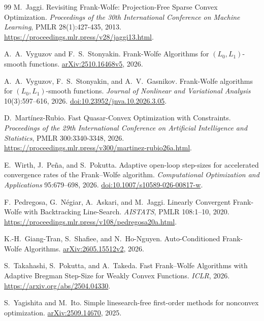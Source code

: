 \begin{thebibliography}{99}
M.~Jaggi.
Revisiting Frank-Wolfe: Projection-Free Sparse Convex Optimization.
\emph{Proceedings of the 30th International Conference on Machine Learning},
PMLR 28(1):427-435, 2013.
\url{https://proceedings.mlr.press/v28/jaggi13.html}.

A.~A.~Vyguzov and F.~S.~Stonyakin.
Frank-Wolfe Algorithms for $(L_0,L_1)$-smooth functions.
\href{https://arxiv.org/abs/2510.16468v5}{arXiv:2510.16468v5}, 2026.

A.~A.~Vyguzov, F.~S.~Stonyakin, and A.~V.~Gasnikov.
Frank-Wolfe algorithms for $(L_0,L_1)$-smooth functions.
\emph{Journal of Nonlinear and Variational Analysis} 10(3):597--616, 2026.
\href{https://doi.org/10.23952/jnva.10.2026.3.05}{doi:10.23952/jnva.10.2026.3.05}.

D.~Mart\'{i}nez-Rubio.
Fast Quasar-Convex Optimization with Constraints.
\emph{Proceedings of the 29th International Conference on
Artificial Intelligence and Statistics}, PMLR 300:3340-3348, 2026.
\url{https://proceedings.mlr.press/v300/martinez-rubio26a.html}.

E.~Wirth, J.~Pe\~na, and S.~Pokutta.
Adaptive open-loop step-sizes for accelerated convergence rates of the
Frank--Wolfe algorithm.
\emph{Computational Optimization and Applications} 95:679--698, 2026.
\href{https://doi.org/10.1007/s10589-026-00817-w}{doi:10.1007/s10589-026-00817-w}.

F.~Pedregosa, G.~N\'{e}giar, A.~Askari, and M.~Jaggi.
Linearly Convergent Frank-Wolfe with Backtracking Line-Search.
\emph{AISTATS}, PMLR 108:1--10, 2020.
\url{https://proceedings.mlr.press/v108/pedregosa20a.html}.

K.-H.~Giang-Tran, S.~Shafiee, and N.~Ho-Nguyen.
Auto-Conditioned Frank-Wolfe Algorithms.
\href{https://arxiv.org/abs/2605.15512v2}{arXiv:2605.15512v2}, 2026.

S.~Takahashi, S.~Pokutta, and A.~Takeda.
Fast Frank--Wolfe Algorithms with Adaptive Bregman Step-Size for Weakly
Convex Functions. \emph{ICLR}, 2026.
\url{https://arxiv.org/abs/2504.04330}.

S.~Yagishita and M.~Ito.
Simple linesearch-free first-order methods for nonconvex optimization.
\href{https://arxiv.org/abs/2509.14670}{arXiv:2509.14670}, 2025.
\end{thebibliography}
